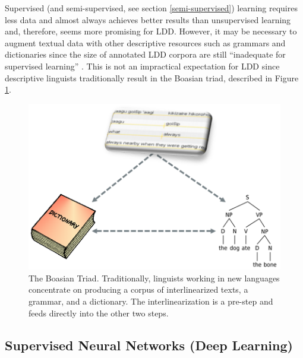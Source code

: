 \documentclass[12pt]{article}
\begin{document}
Supervised (and semi-supervised, see section \ref{semi-supervised}) learning requires less data and almost always achieves better results than unsupervised learning \cite{ruokolainen_supervised_2013} and, therefore, seems more promising for LDD. However, it may be necessary to augment textual data with other descriptive resources such as grammars and dictionaries since the size of annotated LDD corpora are still ``inadequate for supervised learning'' \cite[p. 18]{duong_natural_2017}. This is not an impractical expectation for LDD since descriptive linguists traditionally result in the Boasian triad, described in Figure \ref{fig:Triad}.

\begin{figure}[ht]
\begin{center}
\includegraphics[width=0.7\columnwidth]{Triad.PNG}
\caption{The Boasian Triad. Traditionally, linguists working in new languages concentrate on producing a corpus of interlinearized texts, a grammar, and a dictionary. The interlinearization is a pre-step and feeds directly into the other two steps.}
\label{fig:Triad}
\end{center}
\end{figure}


\subsection{Supervised Neural Networks (Deep Learning)}
\label{sec:NN}
\end{document}
